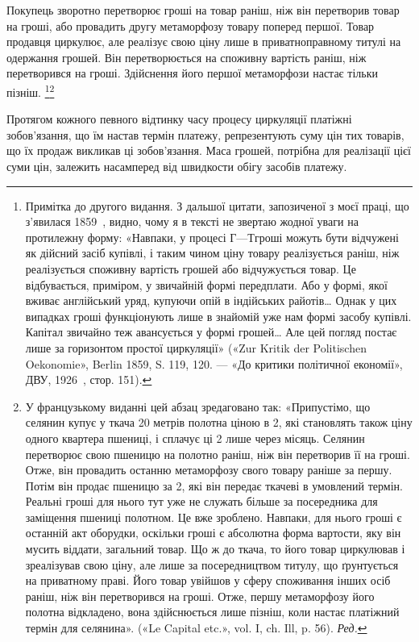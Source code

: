 Покупець зворотно перетворює гроші на товар раніш, ніж
він перетворив товар на гроші, або провадить другу метаморфозу
товару поперед першої. Товар продавця циркулює, але реалізує
свою ціну лише в приватноправному титулі на одержання
грошей. Він перетворюється на споживну вартість раніш, ніж
перетворився на гроші. Здійснення його першої метаморфози
настає тільки пізніш. \footnote*{Примітка до другого видання. З дальшої цитати, запозиченої з
моєї праці, що з’явилася 1859~, видно, чому я в тексті не звертаю жодної
уваги на протилежну форму: «Навпаки, у процесі $Г — Т г$роші можуть
бути відчужені як дійсний засіб купівлі, і таким чином ціну товару реалізується
раніш, ніж реалізується споживну вартість грошей або відчужується
товар. Це відбувається, приміром, у звичайній формі передплати.
Або у формі, якої вживає англійський уряд, купуючи опій в індійських
райотів\dots{} Однак у цих випадках гроші функціонують лише в знайомій
уже нам формі засобу купівлі. Капітал звичайно теж авансується у формі
грошей\dots{} Але цей погляд постає лише за горизонтом простої циркуляції»
(«Zur Kritik der Politischen Oekonomie», Berlin 1859, S. 119, 120. — «До
критики політичної економії», ДВУ, 1926~, стор. 151).}\footnote{У французькому виданні цей абзац зредаговано так: «Припустімо,
що селянин купує у ткача 20 метрів полотна ціною в 2,
які становлять також ціну одного квартера пшениці, і сплачує ці 2 лише через місяць. Селянин перетворює свою пшеницю на
полотно раніш, ніж він перетворив її на гроші. Отже, він провадить останню
метаморфозу свого товару раніше за першу. Потім він продає
пшеницю за 2, які він передає ткачеві в умовлений термін.
Реальні гроші для нього тут уже не служать більше за посередника
для заміщення пшениці полотном. Це вже зроблено. Навпаки, для нього
гроші є останній акт оборудки, оскільки гроші є абсолютна форма вартости,
яку він мусить віддати, загальний товар. Що ж до ткача, то його
товар циркулював і зреалізував свою ціну, але лише за посередництвом
титулу, що ґрунтується на приватному праві. Його товар увійшов у сферу
споживання інших осіб раніш, ніж він перетворився на гроші. Отже,
першу метаморфозу його полотна відкладено, вона здійснюється лише
пізніш, коли настає платіжний термін для селянина». («Le Capital etc.», vol.
I, ch. Ill, p. 56). \emph{Ред.}}

Протягом кожного певного відтинку часу процесу циркуляції
платіжні зобов’язання, що їм настав термін платежу, репрезентують
суму цін тих товарів, що їх продаж викликав ці зобов’язання.
Маса грошей, потрібна для реалізації цієї суми цін,
залежить насамперед від швидкости обігу засобів платежу.
\parbreak{}  %
